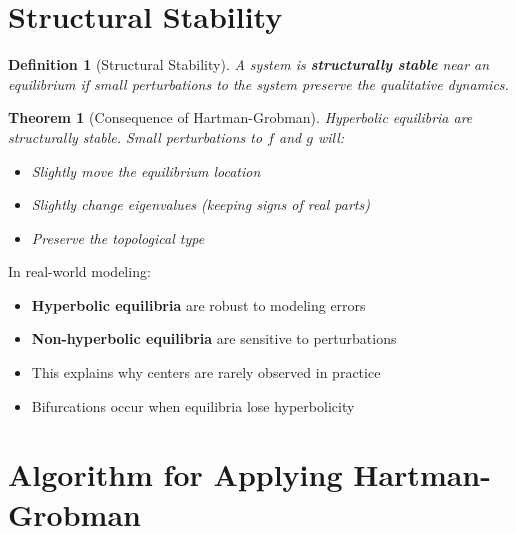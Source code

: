 \documentclass[12pt]{article}
\newtheorem{definition}{Definition}
\newtheorem{theorem}{Theorem}
\begin{document}
\section{Structural Stability}

\begin{definition}[Structural Stability]
A system is \textbf{structurally stable} near an equilibrium if small perturbations to the system preserve the qualitative dynamics.
\end{definition}

\begin{theorem}[Consequence of Hartman-Grobman]
Hyperbolic equilibria are structurally stable. Small perturbations to $f$ and $g$ will:
\begin{itemize}
    \item Slightly move the equilibrium location
    \item Slightly change eigenvalues (keeping signs of real parts)
    \item Preserve the topological type
\end{itemize}
\end{theorem}

\begin{application}
In real-world modeling:
\begin{itemize}
    \item \textbf{Hyperbolic equilibria} are robust to modeling errors
    \item \textbf{Non-hyperbolic equilibria} are sensitive to perturbations
    \item This explains why centers are rarely observed in practice
    \item Bifurcations occur when equilibria lose hyperbolicity
\end{itemize}
\end{application}

\section{Algorithm for Applying Hartman-Grobman}
\end{document}
